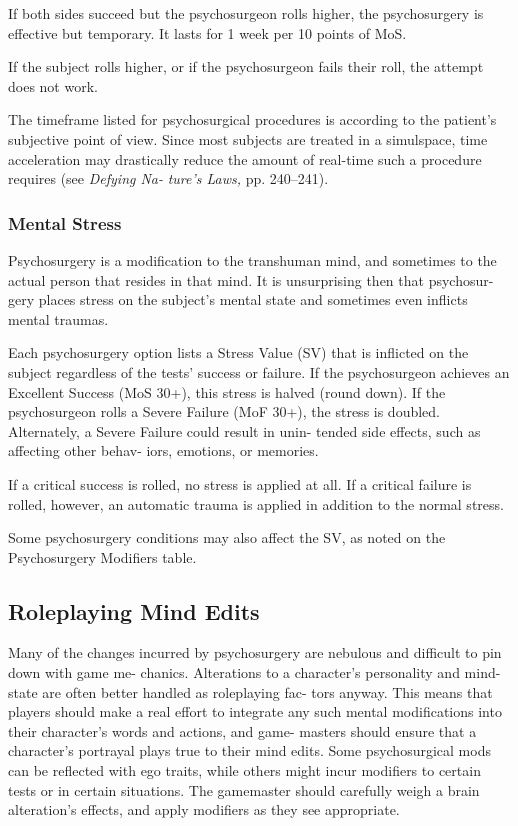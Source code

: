 If both sides succeed but the psychosurgeon rolls 
higher, the psychosurgery is effective but temporary. It 
lasts for 1 week per 10 points of MoS.

If the subject rolls higher, or if the psychosurgeon 
fails their roll, the attempt does not work.

The timeframe listed for psychosurgical procedures 
is according to the patient's subjective point of view. 
Since most subjects are treated in a simulspace, time 
acceleration may drastically reduce the amount of 
real-time such a procedure requires (see \textit{Defying Na-}
\textit{ture's Laws,} pp. 240–241).

\subsubsection{Mental Stress}

Psychosurgery is a modification to the transhuman 
mind, and sometimes to the actual person that resides 
in that mind. It is unsurprising then that psychosur-
gery places stress on the subject's mental state and 
sometimes even inflicts mental traumas.

Each psychosurgery option lists a Stress Value 
(SV) that is inflicted on the subject regardless of 
the tests' success or failure. If the psychosurgeon 
achieves an Excellent Success (MoS 30+), this stress 
is halved (round down). If the psychosurgeon rolls 
a Severe Failure (MoF 30+), the stress is doubled. 
Alternately, a Severe Failure could result in unin-
tended side effects, such as affecting other behav-
iors, emotions, or memories.

If a critical success is rolled, no stress is applied at 
all. If a critical failure is rolled, however, an automatic 
trauma is applied in addition to the normal stress.

Some psychosurgery conditions may also affect the 
SV, as noted on the Psychosurgery Modifiers table.

\subsection{Roleplaying Mind Edits}

Many of the changes incurred by psychosurgery are 
nebulous and difficult to pin down with game me-
chanics. Alterations to a character's personality and 
mind-state are often better handled as roleplaying fac-
tors anyway. This means that players should make a 
real effort to integrate any such mental modifications 
into their character's words and actions, and game-
masters should ensure that a character's portrayal 
plays true to their mind edits. Some psychosurgical 
mods can be reflected with ego traits, while others 
might incur modifiers to certain tests or in certain 
situations. The gamemaster should carefully weigh a 
brain alteration's effects, and apply modifiers as they 
see appropriate.

